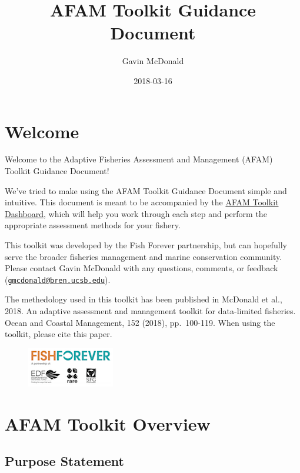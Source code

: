 \documentclass[]{book}
\title{AFAM Toolkit Guidance Document}
\author{Gavin McDonald}
\date{2018-03-16}
\begin{document}
\maketitle

{
\setcounter{tocdepth}{1}
\tableofcontents
}
\chapter*{Welcome}\label{welcome}

Welcome to the Adaptive Fisheries Assessment and Management (AFAM)
Toolkit Guidance Document!

We've tried to make using the AFAM Toolkit Guidance Document simple and
intuitive. This document is meant to be accompanied by the
\href{https://github.com/SFG-UCSB/afamAppPackage}{AFAM Toolkit
Dashboard}, which will help you work through each step and perform the
appropriate assessment methods for your fishery.

This toolkit was developed by the Fish Forever partnership, but can
hopefully serve the broader fisheries management and marine conservation
community. Please contact Gavin McDonald with any questions, comments,
or feedback
(\href{mailto:gmcdonald@bren.ucsb.edu}{\nolinkurl{gmcdonald@bren.ucsb.edu}}).

The methedology used in this toolkit has been published in McDonald et
al., 2018. An adaptive assessment and management toolkit for
data-limited fisheries. Ocean and Coastal Management, 152 (2018),
pp.~100-119. When using the toolkit, please cite this paper.

\begin{figure}
\centering
\includegraphics{myMediaFolder/media/FF_Logo.png}
\caption{}
\end{figure}

\chapter*{AFAM Toolkit Overview}\label{afam-toolkit-overview}

\section{Purpose Statement}\label{purpose-statement}
\end{document}
